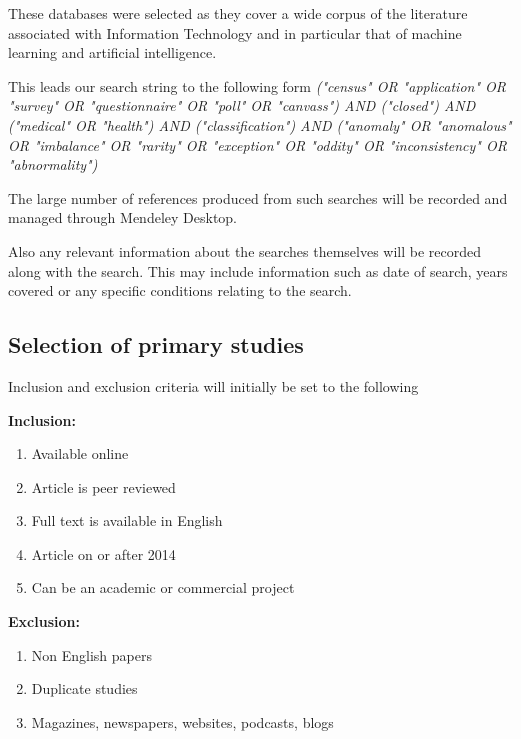 These databases were selected as they cover a wide corpus of the literature associated with Information Technology and in particular that of machine learning and artificial intelligence.



This leads our search string to the following form \textit{("census" OR "application" OR "survey" OR "questionnaire" OR "poll" OR "canvass") AND
  ("closed") AND
  ("medical" OR "health") AND
  ("classification") AND
  ("anomaly" OR "anomalous" OR "imbalance" OR "rarity" OR "exception" OR "oddity" OR "inconsistency" OR "abnormality")}

The large number of references produced from such searches will be recorded and managed through Mendeley Desktop.

Also any relevant information about the searches themselves will be recorded along with the search. This may include information such as date of search, years covered or any specific conditions relating to the search.

\subsection{Selection of primary studies}

\noindent
Inclusion and exclusion criteria will initially be set to the following

\noindent
\textbf{Inclusion:}
\begin{enumerate}
  \item Available online
  \item Article is peer reviewed
  \item Full text is available in English
  \item Article on or after 2014
  \item Can be an academic or commercial project
\end{enumerate}

\noindent
\textbf{Exclusion:}
\begin{enumerate}
  \item Non English papers
  \item Duplicate studies
  \item Magazines, newspapers, websites, podcasts, blogs
\end{enumerate}

